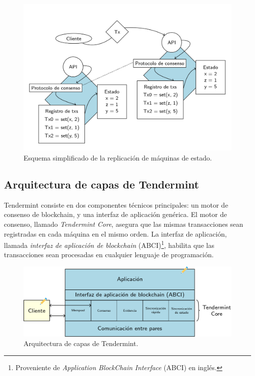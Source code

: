 \begin{figure}
  \centering
  \includegraphics[scale=0.3]{figures/state-machine-replication.png}
  \caption{Esquema simplificado de la replicación de máquinas de estado.}
  \label{fig:replication}
\end{figure}

\subsection{Arquitectura de capas de Tendermint}\label{subsec:layers}
Tendermint consiste en dos componentes técnicos principales: un motor de consenso de blockchain, y una interfaz
de aplicación genérica.
%
El motor de consenso, llamado \textit{Tendermint Core}, asegura que las mismas transacciones sean registradas en cada
máquina en el mismo orden.
%
La interfaz de aplicación, llamada \textit{interfaz de aplicación de blockchain} (ABCI)\footnote{Proveniente de \textit{Application
BlockChain Interface} (ABCI) en inglés.}, habilita que las transacciones
sean procesadas en cualquier lenguaje de programación.

\begin{figure}
  \centering
  \includegraphics[scale=0.3]{figures/tendermint-layers.png}
  \caption{Arquitectura de capas de Tendermint.}
  \label{fig:tendermint-architecture}
\end{figure}

